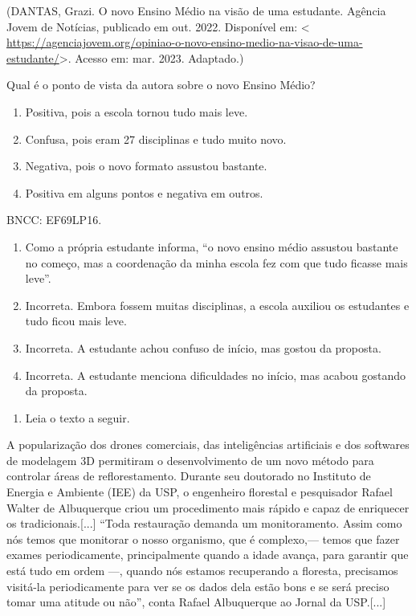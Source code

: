 (DANTAS, Grazi. O novo Ensino Médio na visão de uma estudante. Agência
Jovem de Notícias, publicado em out. 2022. Disponível em: \textless{}
\url{https://agenciajovem.org/opiniao-o-novo-ensino-medio-na-visao-de-uma-estudante/}\textgreater.
Acesso em: mar. 2023. Adaptado.)

Qual é o ponto de vista da autora sobre o novo Ensino Médio?

\begin{enumerate}
\def\labelenumi{\alph{enumi})}
\item
  Positiva, pois a escola tornou tudo mais leve.
\item
  Confusa, pois eram 27 disciplinas e tudo muito novo.
\item
  Negativa, pois o novo formato assustou bastante.
\item
  Positiva em alguns pontos e negativa em outros.
\end{enumerate}

BNCC: EF69LP16.

\begin{enumerate}
\def\labelenumi{\alph{enumi})}
\item
  Como a própria estudante informa, ``o novo ensino médio assustou
  bastante no começo, mas a coordenação da minha escola fez com que tudo
  ficasse mais leve''.
\item
  Incorreta. Embora fossem muitas disciplinas, a escola auxiliou os
  estudantes e tudo ficou mais leve.
\item
  Incorreta. A estudante achou confuso de início, mas gostou da
  proposta.
\item
  Incorreta. A estudante menciona dificuldades no início, mas acabou
  gostando da proposta.
\end{enumerate}

\begin{enumerate}
\def\labelenumi{\arabic{enumi}.}
\setcounter{enumi}{10}
\tightlist
\item
  Leia o texto a seguir.
\end{enumerate}

A popularização dos drones comerciais, das inteligências artificiais e
dos softwares de modelagem 3D permitiram o desenvolvimento de um novo
método para controlar áreas de reflorestamento. Durante seu doutorado no
Instituto de Energia e Ambiente (IEE) da USP, o engenheiro florestal e
pesquisador Rafael Walter de Albuquerque criou um procedimento mais
rápido e capaz de enriquecer os tradicionais.{[}...{]} ``Toda
restauração demanda um monitoramento. Assim como nós temos que monitorar
o nosso organismo, que é complexo,--- temos que fazer exames
periodicamente, principalmente quando a idade avança, para garantir que
está tudo em ordem ---, quando nós estamos recuperando a floresta,
precisamos visitá-la periodicamente para ver se os dados dela estão bons
e se será preciso tomar uma atitude ou não'', conta Rafael Albuquerque
ao Jornal da USP.{[}...{]}

